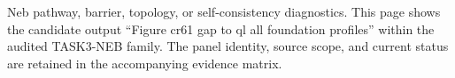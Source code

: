 Neb pathway, barrier, topology, or self-consistency diagnostics. This page shows the candidate output ``Figure cr61 gap to ql all foundation profiles'' within the audited TASK3-NEB family. The panel identity, source scope, and current status are retained in the accompanying evidence matrix.
